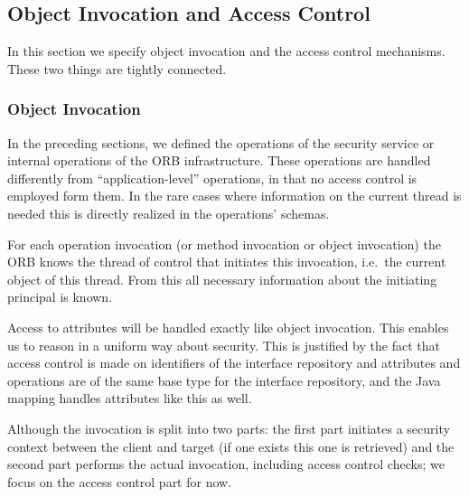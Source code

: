\subsection{Object Invocation and Access Control \label{sec:invocAccess}}

\vspace{2ex}

In this section we specify object invocation and the access control mechanisms.
These two things are tightly connected.

\subsubsection{Object Invocation}
In the preceding sections, we defined the operations of the security service or
internal operations of the ORB infrastructure.  These operations are handled
differently from ``application-level'' operations, in that no access control is
employed form them.  In the rare cases where information on the current thread
is needed this is directly realized in the operations' schemas. 

For each operation invocation (or method invocation or object invocation) the
ORB knows the thread of control that initiates this invocation, i.e.\ the
current object of this thread.  From this all necessary information about the
initiating principal is known.

Access to attributes will be handled exactly like object invocation.  This
enables us to reason in a uniform way about security.  This is justified by the
fact that access control is made on identifiers of the interface repository and
attributes and operations are of the same base type for the interface
repository, and the Java mapping handles attributes like this as well.

Although the invocation is split into two parts: the first part initiates a
security context between the client and target (if one exists this one is
retrieved) and the second part performs the actual invocation, including access
control checks; we focus on the access control part for now.



